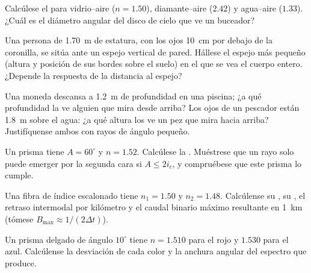 \begin{exercise}[$\star$]\label{exo:b1:rays-reflection-refraction:3}
Calcúlese el  para vidrio--aire ($n = 1.50$), diamante--aire
($2.42$) y agua--aire ($1.33$). ¿Cuál es el diámetro angular del disco de
cielo que ve un buceador?
\end{exercise}

\begin{exercise}[$\star$]\label{exo:b1:rays-reflection-refraction:4}
Una persona de \qty{1.70}{m} de estatura, con los ojos \qty{10}{cm} por
debajo de la coronilla, se sitúa ante un espejo vertical de pared.
Hállese el espejo más pequeño (altura y posición de sus bordes sobre el
suelo) en el que se vea el cuerpo entero. ¿Depende la respuesta de la
distancia al espejo?
\end{exercise}

\begin{exercise}[$\star\star$]\label{exo:b1:rays-reflection-refraction:5}
Una moneda descansa a \qty{1.2}{m} de profundidad en una piscina; ¿a qué
profundidad la ve alguien que mira desde arriba? Los ojos de un pescador
están \qty{1.8}{m} sobre el agua: ¿a qué altura los ve un pez que mira
hacia arriba? Justifíquense ambos con rayos de ángulo pequeño.
\end{exercise}

\begin{exercise}[$\star\star$]\label{exo:b1:rays-reflection-refraction:6}
Un prisma tiene $A = 60^\circ$ y $n = 1.52$. Calcúlese la . Muéstrese que un rayo solo puede emerger por la segunda cara si
$A \leq 2 i_c$, y compruébese que este prisma lo cumple.
\end{exercise}

\begin{exercise}[$\star\star$]\label{exo:b1:rays-reflection-refraction:7}
Una fibra de índice escalonado tiene $n_1 = 1.50$ y $n_2 = 1.48$.
Calcúlense su , su , el retraso
intermodal por kilómetro y el caudal binario máximo resultante en
\qty{1}{km} (tómese $B_{\max} \approx 1/(2\Delta t)$).
\end{exercise}

\begin{exercise}[$\star\star$]\label{exo:b1:rays-reflection-refraction:8}
Un prisma delgado de ángulo $10^\circ$ tiene $n = 1.510$ para el rojo y
$1.530$ para el azul. Calcúlense la desviación de cada color y la anchura
angular del espectro que produce.
\end{exercise}

